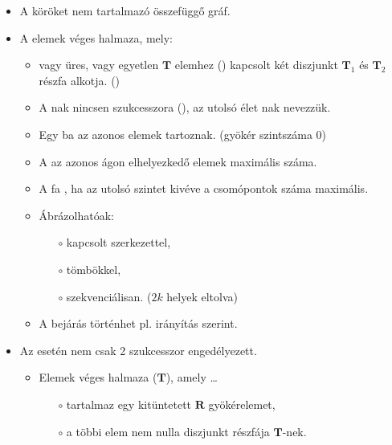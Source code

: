 \documentclass[../../main.tex]{subfiles}
\begin{document}
\begin{itemize}
  \item A  köröket nem tartalmazó összefüggő gráf.

  \item A  elemek véges halmaza, mely:
        \begin{itemize}
          \item vagy üres, vagy egyetlen $\mathbf{T}$ elemhez ()
                kapcsolt két diszjunkt $\mathbf{T}_1$ és $\mathbf{T}_2$
                részfa alkotja. ()

          \item A nak nincsen szukcesszora
                (), az utolsó élet nak nevezzük.

          \item Egy ba az azonos  elemek tartoznak.
                (gyökér szintszáma 0)

          \item A  az azonos ágon elhelyezkedő elemek maximális száma.

          \item A fa , ha az utolsó szintet kivéve
                a csomópontok száma maximális.

          \item Ábrázolhatóak:
                \begin{itemize}
                  \item[$\circ$] kapcsolt szerkezettel,
                  \item[$\circ$] tömbökkel,
                  \item[$\circ$] szekvenciálisan. ($2k$ helyek eltolva)
                \end{itemize}

          \item A bejárás történhet pl. irányítás szerint.
        \end{itemize}

  \item Az  esetén nem csak 2 szukcesszor engedélyezett.
        \begin{itemize}
          \item Elemek véges halmaza ($\mathbf{T}$), amely \dots
                \begin{itemize}
                  \item[$\circ$] tartalmaz egy kitüntetett
                    $\mathbf{R}$ gyökérelemet,
                  \item[$\circ$] a többi elem nem nulla diszjunkt
                    részfája $\mathbf{T}$-nek.
                \end{itemize}
        \end{itemize}


\end{itemize}
\end{document}
